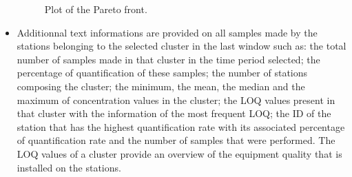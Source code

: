 \begin{itemize}
\begin{figure}[ht]
 \caption{Plot of the Pareto front.}
 \label{fig:Imapp8}
\end{figure}
\item Additionnal text informations are provided on all samples made by the stations belonging to the selected cluster in the last window such as: the total number of samples made in that cluster in the time period selected; the percentage of quantification of these samples; the number of stations composing the cluster; the minimum, the mean, the median and the maximum of concentration values in the cluster; the LOQ values present in that cluster with the information of the most frequent LOQ; the ID of the station that has the highest quantification rate with its associated percentage of quantification rate and the number of samples that were performed. The LOQ values of a cluster provide an overview of the equipment quality that is installed on the stations.    
\end{itemize}

